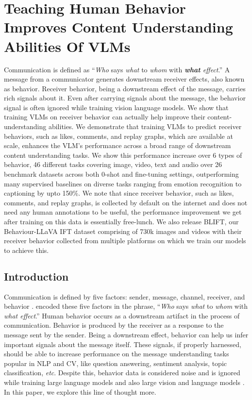 \section{Teaching Human Behavior Improves Content Understanding Abilities Of VLMs}

Communication is defined as ``\textit{Who} says \textit{what} to \textit{whom} with \textit{\textbf{what} effect}.'' A message from a communicator generates downstream receiver effects, also known as behavior. Receiver behavior, being a downstream effect of the message, carries rich signals about it. Even after carrying signals about the message, the behavior signal is often ignored while training vision language models. We show that training VLMs on receiver behavior can actually help improve their content-understanding abilities. We demonstrate that training VLMs to predict receiver behaviors, such as likes, comments, and replay graphs, which are available at scale, enhances the VLM's performance across a broad range of downstream content understanding tasks. We show this performance increase over 6 types of behavior, 46 different tasks covering image, video, text and audio over 26 benchmark datasets across both 0-shot and fine-tuning settings, outperforming many supervised baselines on diverse tasks ranging from emotion recognition to captioning by upto 150\%. We note that since receiver behavior, such as likes, comments, and replay graphs, is collected by default on the internet and does not need any human annotations to be useful, the performance improvement we get after training on this data is essentially free-lunch. We also release BLIFT, our Behaviour-LLaVA IFT dataset comprising of 730k images and videos with their receiver behavior collected from multiple platforms on which we train our models to achieve this.


\subsection{Introduction}
Communication is defined by five factors: sender, message, channel, receiver, and behavior \cite{shannon-weaver-1949,lasswell1948structure,lasswell1971propaganda}. \citet{lasswell1948structure} encoded these five factors in the phrase, ``\textit{Who} says \textit{what} to \textit{whom} with \textit{what effect}.'' Human behavior occurs as a downstream artifact in the process of communication. Behavior is produced by the receiver as a response to the message sent by the sender. Being a downstream effect, behavior can help us infer important signals about the message itself. These signals, if properly harnessed, should be able to increase performance on the message understanding tasks popular in NLP and CV, like question answering, sentiment analysis, topic classification, \textit{etc}. Despite this, behavior data is considered noise and is ignored while training large language models \cite{biderman2022datasheet,penedo2023refinedweb} and also large vision and language models \cite{liu2023visual,zhu2023minigpt}. In this paper, we explore this line of thought more.


